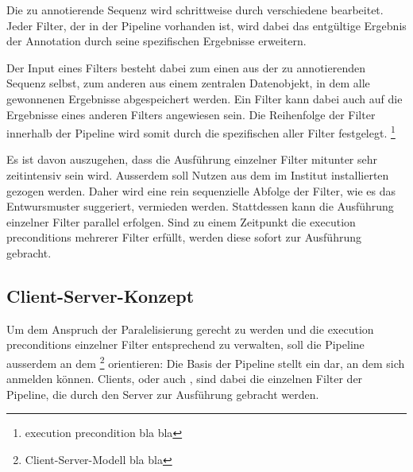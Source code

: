 Die zu annotierende Sequenz wird schrittweise durch verschiedene 
bearbeitet. Jeder Filter, der in der Pipeline vorhanden ist, wird dabei das
entgültige Ergebnis der Annotation durch seine spezifischen Ergebnisse
erweitern.

Der Input eines Filters besteht dabei zum einen aus der zu
annotierenden Sequenz selbst, zum anderen aus einem zentralen Datenobjekt, in
dem alle gewonnenen Ergebnisse abgespeichert werden.
Ein Filter kann dabei auch auf die Ergebnisse eines anderen
Filters angewiesen sein. Die Reihenfolge der Filter innerhalb der Pipeline wird
somit durch die spezifischen  aller
Filter festgelegt.
\footnote{execution precondition bla bla}

Es ist davon auszugehen, dass die Ausführung einzelner Filter mitunter sehr
zeitintensiv sein wird. Ausserdem soll Nutzen aus dem im Institut installierten
 gezogen werden. Daher wird eine rein sequenzielle Abfolge der
Filter, wie es das Entwursmuster suggeriert, vermieden werden.
Stattdessen kann die Ausführung einzelner Filter parallel erfolgen.
Sind zu einem Zeitpunkt die execution preconditions mehrerer Filter erfüllt,
werden diese sofort zur Ausführung gebracht.

\subsection{Client-Server-Konzept}
Um dem Anspruch der Paralelisierung gerecht zu werden und die execution
preconditions einzelner Filter entsprechend zu verwalten, soll die Pipeline
ausserdem an dem 
\footnote{Client-Server-Modell bla bla} orientieren:
Die Basis der Pipeline stellt ein  dar, an dem sich
 anmelden können.
Clients, oder auch , sind dabei die einzelnen Filter der
Pipeline, die durch den Server zur Ausführung gebracht werden.

